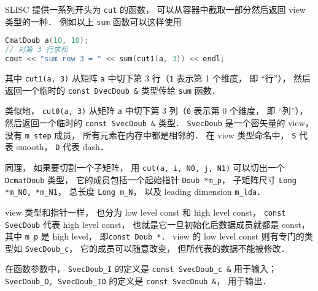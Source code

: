 SLISC 提供一系列开头为 \verb|cut| 的函数， 可以从容器中截取一部分然后返回 view 类型的一种． 例如以上 \verb|sum| 函数可以这样使用
\begin{lstlisting}[language=cpp]
CmatDoub a(10, 10);
// 对第 3 行求和
cout << "sum row 3 = " << sum(cut1(a, 3)) << endl;
\end{lstlisting}
其中 \verb|cut1(a, 3)| 从矩阵 \verb|a| 中切下第 3 行（\verb|1| 表示第 1 个维度， 即 “行”）， 然后返回一个临时的 \verb|const DvecDoub &| 类型传给 \verb|sum| 函数．

类似地， \verb|cut0(a, 3)| 从矩阵 \verb|a| 中切下第 3 列（\verb|0| 表示第 0 个维度， 即 “列”）， 然后返回一个临时的 \verb|const SvecDoub &| 类型． \verb|SvecDoub| 是一个密矢量的 view， 没有 \verb|m_step| 成员， 所有元素在内存中都是相邻的． 在 view 类型命名中， \verb|S| 代表 smooth， \verb|D| 代表 dash．

同理， 如果要切割一个子矩阵， 用 \verb|cut(a, i, N0, j, N1)| 可以切出一个 \verb|DcmatDoub| 类型， 它的成员包括一个起始指针 \verb|Doub *m_p|， 子矩阵尺寸 \verb|Long *m_N0, *m_N1|， 总长度 \verb|Long m_N|， 以及 leading dimension \verb|m_lda|．

view 类型和指针一样， 也分为 low level const 和 high level const， \verb|const SvecDoub| 代表 high level const， 也就是它一旦初始化后数据成员就都是 const， 其中 \verb|m_p| 是 high level， 即\verb|const Doub *|． view 的 low level const 则有专门的类型如 \verb|SvecDoub_c|， 它的成员可以随意改变， 但所代表的数据不能被修改．

在函数参数中， \verb|SvecDoub_I| 的定义是 \verb|const SvecDoub_c &| 用于输入； \verb|SvecDoub_O, SvecDoub_IO| 的定义是 \verb|const SvecDoub &|， 用于输出．

